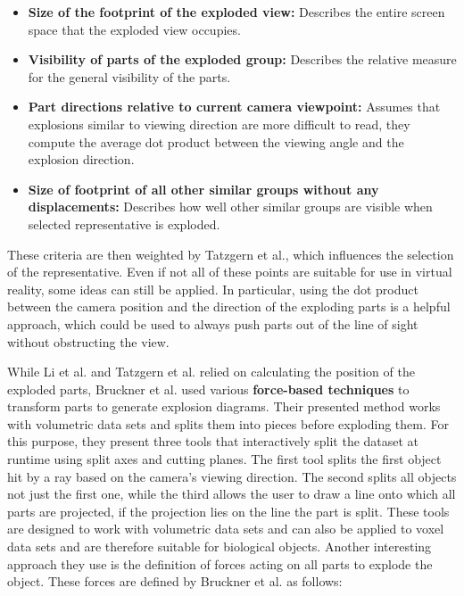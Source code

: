 \begin{itemize}
	\item \textbf{Size of the footprint of the exploded view:} Describes the entire screen space that the exploded view occupies.
	\item \textbf{Visibility of parts of the exploded group:} Describes the relative measure for the general visibility of the parts.
	\item \textbf{Part directions relative to current camera viewpoint:} Assumes that explosions similar to viewing direction are more difficult to read, they compute the average dot product between the viewing angle and the explosion direction.
	\item \textbf{Size of footprint of all other similar groups without any displacements:} Describes how well other similar groups are visible when selected representative is exploded.
\end{itemize}

These criteria are then weighted by Tatzgern et al., which influences the selection of the representative.
Even if not all of these points are suitable for use in virtual reality, some ideas can still be applied.
In particular, using the dot product between the camera position and the direction of the exploding parts is a helpful approach, which could be used to always push parts out of the line of sight without obstructing the view.

While Li et al. and Tatzgern et al. relied on calculating the position of the exploded parts, Bruckner et al. used various \textbf{force-based techniques} to transform parts to generate explosion diagrams.\cite{Bruckner_2006}
Their presented method works with volumetric data sets and splits them into pieces before exploding them. 
For this purpose, they present three tools that interactively split the dataset at runtime using split axes and cutting planes. 
The first tool splits the first object hit by a ray based on the camera's viewing direction. The second splits all objects not just the first one, while the third allows the user to draw a line onto which all parts are projected, if the projection lies on the line the part is split. 
These tools are designed to work with volumetric data sets and can also be applied to voxel data sets and are therefore suitable for biological objects.
Another interesting approach they use is the definition of forces acting on all parts to explode the object.
These forces are defined by Bruckner et al. as follows:

